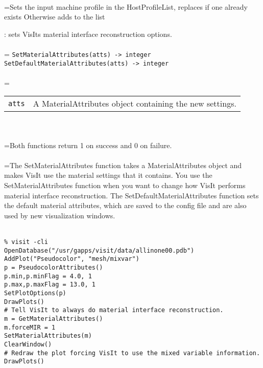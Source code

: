 \documentclass[10pt,a4paper]{report}
\begin{document}
 \\ 
\hangindent=\parindent Sets the input machine profile in the HostProfileList, replaces if one already exists Otherwise adds to the list \\[-3mm] 

\newpage


{}
: sets VisIts material interface reconstruction options.\\[-3mm]

 \\ 
\hangindent=\parindent 
\verb!SetMaterialAttributes(atts) -> integer!\\ 
\verb!SetDefaultMaterialAttributes(atts) -> integer!\\ [-3mm]

 \\ 
\hangindent=\parindent 
\begin{tabular}{lp{9cm}}
\verb!atts! & A MaterialAttributes object containing the new settings. \\
\end{tabular} \\[-2mm]


 \\ 
\hangindent=\parindent Both functions return 1 on success and 0 on failure. \\[-3mm] 

 \\ 
\hangindent=\parindent The SetMaterialAttributes function takes a MaterialAttributes object and makes VisIt use the material settings that it contains. You use the SetMaterialAttributes function when you want to change how VisIt performs material interface reconstruction. The SetDefaultMaterialAttributes function sets the default material attributes, which are saved to the config file and are also used by new visualization windows. \\[-3mm] 

\\[-6mm]
\begin{verbatim}% visit -cli
OpenDatabase("/usr/gapps/visit/data/allinone00.pdb")
AddPlot("Pseudocolor", "mesh/mixvar")
p = PseudocolorAttributes()
p.min,p.minFlag = 4.0, 1
p.max,p.maxFlag = 13.0, 1
SetPlotOptions(p)
DrawPlots()
# Tell VisIt to always do material interface reconstruction.
m = GetMaterialAttributes()
m.forceMIR = 1
SetMaterialAttributes(m)
ClearWindow()
# Redraw the plot forcing VisIt to use the mixed variable information.
DrawPlots()
\end{verbatim}
\newpage
\end{document}
